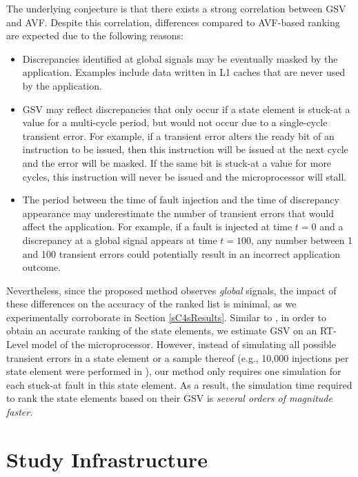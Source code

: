 \documentclass[12pt]{yalephd}
\begin{document}
The underlying conjecture is that there exists a strong correlation between GSV and AVF. Despite this correlation, differences compared to AVF-based ranking are expected due to the following reasons:
\begin{itemize}
\item Discrepancies identified at global signals may be eventually masked by the application. Examples include data written in L1 caches that are never used by the application.
\item GSV may reflect discrepancies that only occur if a state element is stuck-at a value for a multi-cycle period, but would not occur due to a single-cycle transient error. For example, if a transient error alters the ready bit of an instruction to be issued, then this instruction will be issued at the next cycle and the error will be masked. If the same bit is stuck-at a value for more cycles, this instruction will never be issued and the microprocessor will stall.
\item The period between the time of fault injection and the time of discrepancy appearance may underestimate the number of transient errors that would affect the application. For example, if a fault is injected at time $t=0$ and a discrepancy at a global signal appears at time $t=100$, any number between 1 and 100 transient errors could potentially result in an incorrect application outcome.
\end{itemize}

Nevertheless, since the proposed method observes {\em global} signals, the impact of these differences on the accuracy of the ranked list is minimal, as we experimentally corroborate in Section \ref{sC4sResults}. Similar to \cite{WMP07}, in order to obtain an accurate ranking of the state elements, we estimate GSV on an RT-Level model of the microprocessor. However, instead of simulating all possible transient errors in a state element or a sample thereof (e.g., 10,000 injections per state element were performed in \cite{WMP07}), our method only requires one simulation for each stuck-at fault in this state element. As a result, the simulation time required to rank the state elements based on their GSV is {\em several orders of magnitude faster}. %

\section{Study Infrastructure} \label{sC4sStudy_infr}
\end{document}
